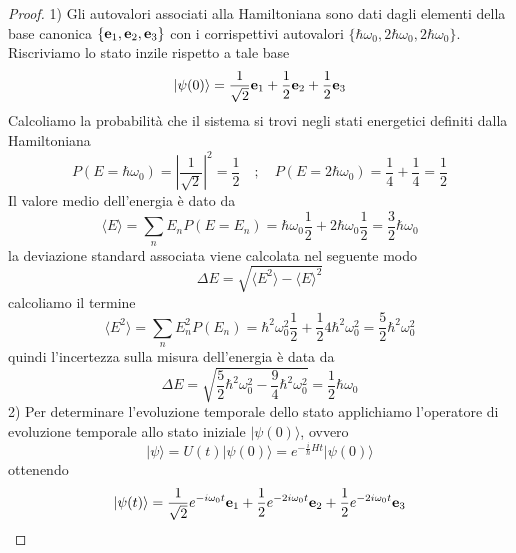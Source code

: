 \begin{proof}
	1) Gli autovalori associati alla Hamiltoniana sono dati dagli elementi della base canonica $\{\bold{e}_{1},\bold{e}_{2},\bold{e}_3\}$ con i corrispettivi autovalori $\{\hbar \omega_0,2\hbar \omega_0,2\hbar \omega_0 \}$. Riscriviamo lo stato inzile rispetto a tale base 
	\begin{equation*}
		|\psi(0) \rangle = \frac{1}{\sqrt{2}}\bold{e}_1 + \frac{1}{2} \bold{e}_2 + \frac{1}{2} \bold{e}_{3}
	\end{equation*}
Calcoliamo la probabilit\`a che il sistema si trovi negli stati energetici definiti dalla 
Hamiltoniana
\begin{equation*}
P(E = \hbar\omega_0) = \left | \frac{1}{\sqrt{2}} \right |^2 = \frac{1}{2} \quad ; \quad P(E = 2 \hbar \omega_0) = \frac{1}{4} + \frac{1}{4} = \frac{1}{2} 	
\end{equation*}
Il valore medio dell'energia \`e dato da
\begin{equation*}
	\langle E \rangle = \sum_{n} E_n P(E=E_n) = \hbar \omega_0 \frac{1}{2} + 2 \hbar \omega_0 \frac{1}{2} = \frac{3}{2}\hbar \omega_0
\end{equation*}
la deviazione standard associata viene calcolata nel seguente modo
\begin{equation*}
	\Delta E = \sqrt{\langle E^2 \rangle - \langle E \rangle ^2} 
\end{equation*}
calcoliamo il termine
\begin{equation*}
	\langle E^2 \rangle = \sum_{n}E_n^2 P(E_n) = \hbar^2 \omega_0^2 \frac{1}{2}  + \frac{1}{2}4 \hbar^2 \omega_0^2 = \frac{5}{2}\hbar^2 \omega_0^2
\end{equation*}
quindi l'incertezza sulla misura dell'energia \`e data da 
\begin{equation*}
	\Delta E = \sqrt{\frac{5}{2} \hbar^2 \omega_0^2 - \frac{9}{4} \hbar^2 \omega_0^2} = \frac{1}{2}\hbar \omega_0
\end{equation*}
2) Per determinare l'evoluzione temporale dello stato applichiamo l'operatore di evoluzione temporale allo stato iniziale $|\psi(0) \rangle $, ovvero
\begin{equation*}
	|\psi \rangle = U(t)|\psi(0) \rangle = e^{- \frac{i}{\hbar}Ht}|\psi(0)\rangle 
\end{equation*}
ottenendo
\begin{equation*}
	|\psi(t) \rangle = \frac{1}{\sqrt{2}} e^{-i\omega_0 t}\bold{e}_{1}+ \frac{1}{2} e^{-2i\omega_0t}\bold{e}_{2} + \frac{1}{2}e^{-2i \omega_0 t}\bold{e}_{3}
\end{equation*}

\end{proof}
